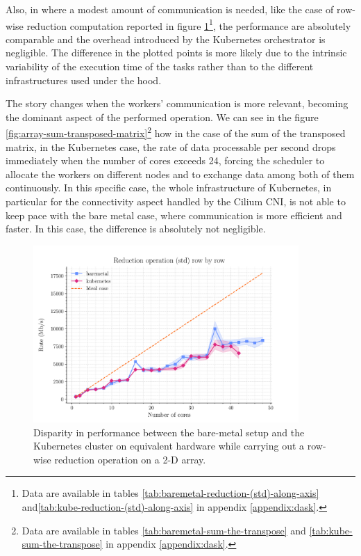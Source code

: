 Also, in where a modest amount of communication is needed, like the case of
row-wise reduction computation reported in figure
\ref{fig:array-reduction-std-along-axis}\footnote{
  Data are available in tables \ref{tab:baremetal-reduction-(std)-along-axis}
  and\ref{tab:kube-reduction-(std)-along-axis} in appendix \ref{appendix:dask}.
}, the performance are absolutely comparable and the overhead introduced by the
Kubernetes orchestrator is negligible. The difference in the plotted points is
more likely due to the intrinsic variability of the execution time of the tasks
rather than to the different infrastructures used under the hood.

The story changes when the workers' communication is more relevant, becoming the
dominant aspect of the performed operation.
We can see in the figure \ref{fig:array-sum-transposed-matrix}\footnote{
  Data are available in tables \ref{tab:baremetal-sum-the-transpose} and
  \ref{tab:kube-sum-the-transpose} in appendix \ref{appendix:dask}.
} how in the case of the sum of the transposed matrix, in the Kubernetes case,
the rate of data processable per second drops immediately when the number of
cores exceeds 24, forcing the scheduler to allocate the workers on different
nodes and to exchange data among both of them continuously.
In this specific case, the whole infrastructure of Kubernetes, in particular for
the connectivity aspect handled by the Cilium CNI, is not able to keep pace with
the bare metal case, where communication is more efficient and faster.
In this case, the difference is absolutely not negligible.

\begin{figure}
  \centering
  \includegraphics[width=0.9\textwidth]{img/chpt4/array-reduction-std-along-axis}
  \caption{Disparity in performance between the bare-metal setup and the
    Kubernetes cluster on equivalent hardware while carrying out a row-wise
    reduction operation on a 2-D array.}
  \label{fig:array-reduction-std-along-axis}
\end{figure}

